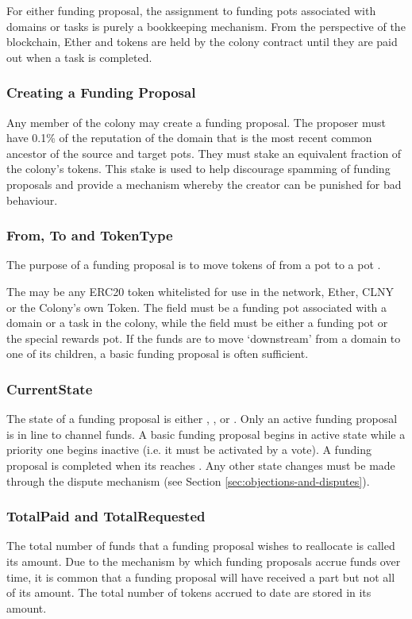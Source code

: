 For either funding proposal, the assignment to funding pots associated with domains or tasks is purely a bookkeeping mechanism. From the perspective of the blockchain, Ether and tokens are held by the colony contract until they are paid out when a task is completed.

\subsubsection{Creating a Funding Proposal}
Any member of the colony may create a funding proposal. The proposer must have 0.1\% of the reputation of the domain that is the most recent common ancestor of the source and target pots. They must stake an equivalent fraction of the colony's tokens. This stake is used to help discourage spamming of funding proposals and provide a mechanism whereby the creator can be punished for bad behaviour.

\subsubsection{From, To and TokenType}
The purpose of a funding proposal is to move tokens of  from a pot  to a pot .

The  may be any ERC20 token whitelisted for use in the network, Ether, CLNY or the Colony's own Token. The  field must be a funding pot associated with a domain or a task in the colony, while the  field must be either a funding pot or the special rewards pot. If the funds are to move `downstream' from a domain to one of its children, a basic funding proposal is often sufficient.

\subsubsection{CurrentState}
The state of a funding proposal is either , ,  or . Only an active funding proposal is in line to channel funds. A basic funding proposal begins in active state while a priority one begins inactive (i.e. it must be activated by a vote). A funding proposal is completed when its  reaches . Any other state changes must be made through the dispute mechanism (see Section \ref{sec:objections-and-disputes}).

\subsubsection{TotalPaid and TotalRequested}
The total number of funds that a funding proposal wishes to reallocate is called its  amount. Due to the mechanism by which funding proposals accrue funds over time, it is common that a funding proposal will have received a part but not all of its  amount. The total number of tokens accrued to date are stored in its  amount.


